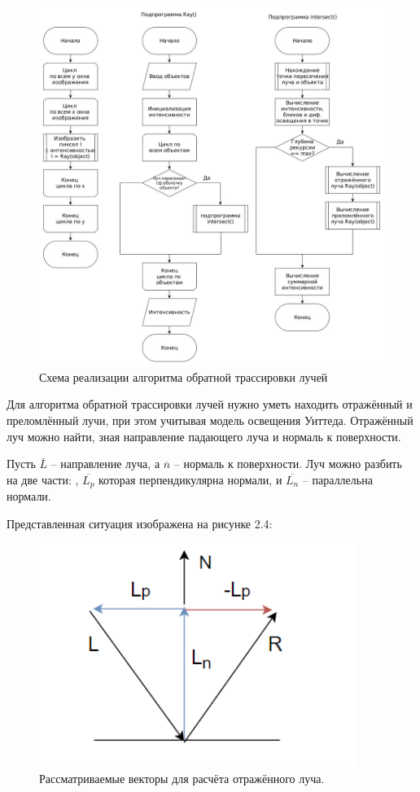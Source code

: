 \FloatBarrier
\begin{figure}[h]
	\begin{center}
		\includegraphics[width=\linewidth]{graph/tras.jpg}
	\end{center}
	\caption{Схема реализации алгоритма обратной трассировки лучей}
\end{figure}
\FloatBarrier

Для алгоритма обратной трассировки лучей нужно уметь находить отражённый и преломлённый лучи, при этом учитывая модель освещения Уиттеда.
Отражённый луч можно найти, зная направление падающего луча и нормаль к поверхности. 

Пусть $ \overline{L} $ -- направление луча, а $ \overline{n} $ – нормаль к поверхности. 
Луч можно разбить на две части: , $ \overline{L_p} $ которая перпендикулярна нормали, и  $ \overline{L_n} $ – параллельна нормали.

Представленная ситуация изображена на рисунке 2.4:
\FloatBarrier
\begin{figure}[h]
	\begin{center}
		\includegraphics[]{inc/vecs.png}
	\end{center}
	\caption{Рассматриваемые векторы для расчёта отражённого луча.}
\end{figure}
\FloatBarrier


